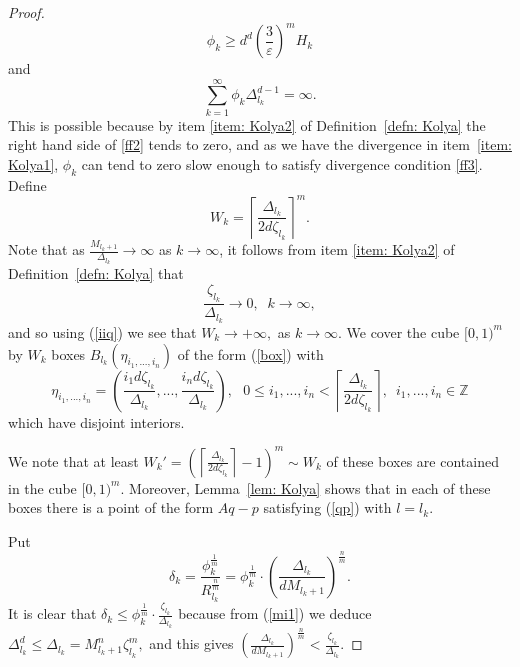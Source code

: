 \documentclass[reqno,11pt, twoside]{amsart}
\theoremstyle{plain}
\theoremstyle{definition}
\theoremstyle{definition}
\theoremstyle{remark}
\numberwithin{equation}{section}
\begin{document}
\begin{proof}
  \begin{equation}\label{ff2}
  \phi_k \ge  
  d^d \left(\frac{3}{\varepsilon}\right)^{m} H_k
  \end{equation}
and
 \begin{equation}\label{ff3}
 \sum_{k=1}^\infty \phi_k 
\Delta_{l_k}^{d-1}=\infty.
 \end{equation}
 This is possible because by item \eqref{item: Kolya2} of Definition~\ref{defn: Kolya}  the right hand side of \eqref{ff2} tends to zero, and as we have the divergence in item~\eqref{item: Kolya1}, $\phi_k$ can tend to zero slow enough to satisfy divergence condition \eqref{ff3}.
 Define
 $$
 W_k = \left\lceil \frac{\Delta_{l_k}}{2d\zeta_{l_k}}\right\rceil^m
.
$$
Note that 
as $\frac{M_{l_{k}+1}}{\Delta_{l_{k}}} \to \infty$ as  $k\to \infty$, it follows from 
item \eqref{item: Kolya2} of Definition~\ref{defn: Kolya} that
\begin{equation}
\label{iiq}
\frac{\zeta_{l_{k}}}{\Delta_{l_{k}}}   \to 0, \,\,\ k \to \infty,
\end{equation}
and so using (\ref{iiq}) we see that  $W_k \to +\infty,$ as 
$k \to \infty$.
We cover the cube $[0,1)^m$ by  $ W_k$    boxes 
$B_{l_k}({\eta}_{i_1,...,i_n})$
of the form (\ref{box})
with 
$${\eta}_{i_1,...,i_n} = \left(\frac{i_1d\zeta_{l_k}}{\Delta_{l_k}},..., \frac{i_nd\zeta_{l_k}}{\Delta_{l_k}}\right), \,\,\,\, 0\le i_1,...,i_n <  \left\lceil \frac{\Delta_{l_k}}{2d\zeta_{l_k}}\right\rceil,\,\,\, i_1,...,i_n \in \mathbb{Z}
$$
which have disjoint interiors. 
 
We note that 
at least $W_k' = \left(  \left\lceil \frac{\Delta_{l_k}}{2d\zeta_{l_k}}\right\rceil -1\right)^m\sim W_k$ of these boxes are 
contained in the cube $[0,1)^m$.
Moreover, Lemma~\ref{lem: Kolya} shows that 
  in each of these boxes there is a point of the form $Aq-p$  satisfying (\ref{qp}) with $l = l_k$.
 

Put
$$
\delta_k = \frac{\phi_k^{\frac{1}{m}} }{R_{l_k}^{\frac{n}{m}}}  =  \phi_k^{\frac{1}{m}}\cdot\left( \frac{ \Delta_{l_k}}{dM_{l_k+1}}\right)^{\frac{n}{m}}.
$$
It is clear that 
$
\delta_k \le \phi_k^{\frac{1}{m}}\cdot \frac{\zeta_{l_k}}{\Delta_{l_k}}
$
because from (\ref{mi1}) we deduce
$
\Delta_{l_k}^d \le \Delta_{l_k} = M_{l_k+1}^n \zeta_{l_k}^m,
$
and this gives
$
\left(\frac{\Delta_{l_k}}{dM_{l_k+1}}\right)^{\frac{n}{m}} < \frac{\zeta_{l_k}}{\Delta_{l_k}}.
$
 

\end{proof}
\end{document}
